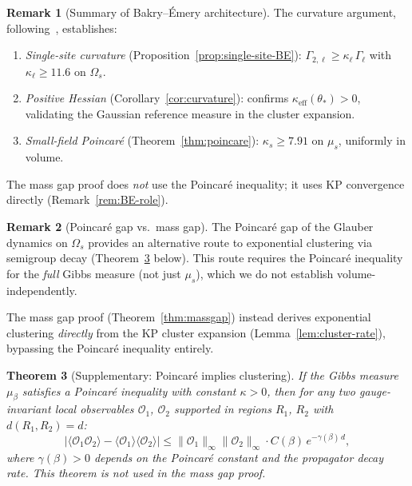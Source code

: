 \documentclass[11pt]{article}
\newtheorem{theorem}{Theorem}[section]
\theoremstyle{definition}
\newtheorem{remark}[theorem]{Remark}
\begin{document}
\begin{remark}[Summary of Bakry--\'Emery architecture]%
\label{rem:BE-domain}
The curvature argument, following~\cite{BakryEmery,Fontes2026BE},
establishes:
\begin{enumerate}[nosep]
\item \emph{Single-site curvature}
(Proposition~\ref{prop:single-site-BE}):
$\Gamma_{2,\ell}\ge\kappa_\ell\,\Gamma_\ell$ with
$\kappa_\ell\ge 11.6$ on $\Omega_s$.
\item \emph{Positive Hessian}
(Corollary~\ref{cor:curvature}):
confirms $\kappa_{\mathrm{eff}}(\theta_*)>0$, validating
the Gaussian reference measure in the cluster expansion.
\item \emph{Small-field Poincar\'e}
(Theorem~\ref{thm:poincare}):
$\kappa_s\ge 7.91$ on $\mu_s$, uniformly in volume.
\end{enumerate}
The mass gap proof does \emph{not} use the Poincar\'e
inequality; it uses KP convergence directly
(Remark~\ref{rem:BE-role}).
\end{remark}

\begin{remark}[Poincar\'e gap vs.\ mass gap]
The Poincar\'e gap of the Glauber dynamics on $\Omega_s$
provides an alternative route to exponential clustering
via semigroup decay (Theorem~\ref{thm:clustering} below).
This route requires the Poincar\'e inequality for
the \emph{full} Gibbs measure (not just $\mu_s$), which
we do not establish volume-independently.

The mass gap proof (Theorem~\ref{thm:massgap}) instead
derives exponential clustering \emph{directly} from the
KP cluster expansion (Lemma~\ref{lem:cluster-rate}),
bypassing the Poincar\'e inequality entirely.
\end{remark}

\begin{theorem}[Supplementary: Poincar\'e implies clustering]
\label{thm:clustering}
If the Gibbs measure $\mu_\beta$ satisfies a Poincar\'e inequality
with constant $\kappa>0$, then for any
two gauge-invariant local observables $\mathcal{O}_1$, $\mathcal{O}_2$
supported in regions $R_1$, $R_2$ with $d(R_1,R_2)=d$:
\begin{equation}\label{eq:exp-cluster}
|\langle\mathcal{O}_1\mathcal{O}_2\rangle
-\langle\mathcal{O}_1\rangle\langle\mathcal{O}_2\rangle|
\le\|\mathcal{O}_1\|_\infty\|\mathcal{O}_2\|_\infty
\cdot C(\beta)\,e^{-\gamma(\beta)\,d},
\end{equation}
where $\gamma(\beta)>0$ depends on the Poincar\'e constant and the
propagator decay rate.
This theorem is not used in the mass gap proof.
\end{theorem}
\end{document}
